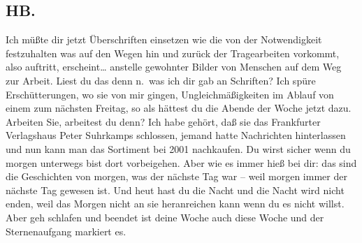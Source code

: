 \documentclass[
]{article}
\author{}
\date{\vspace{-2.5em}}
\begin{document}
\subsection{HB.}\label{hb.}

Ich müßte dir jetzt Überschriften einsetzen wie die von der
Notwendigkeit festzuhalten was auf den Wegen hin und zurück der
Tragearbeiten vorkommt, also auftritt, erscheint\ldots{} anstelle
gewohnter Bilder von Menschen auf dem Weg zur Arbeit. Liest du das denn
n.~was ich dir gab an Schriften? Ich spüre Erschütterungen, wo sie von
mir gingen, Ungleichmäßigkeiten im Ablauf von einem zum nächsten
Freitag, so als hättest du die Abende der Woche jetzt dazu. Arbeiten
Sie, arbeitest du denn? Ich habe gehört, daß sie das Frankfurter
Verlagshaus Peter Suhrkamps schlossen, jemand hatte Nachrichten
hinterlassen und nun kann man das Sortiment bei 2001 nachkaufen. Du
wirst sicher wenn du morgen unterwegs bist dort vorbeigehen. Aber wie es
immer hieß bei dir: das sind die Geschichten von morgen, was der nächste
Tag war -- weil morgen immer der nächste Tag gewesen ist. Und heut hast
du die Nacht und die Nacht wird nicht enden, weil das Morgen nicht an
sie heranreichen kann wenn du es nicht willst. Aber geh schlafen und
beendet ist deine Woche auch diese Woche und der Sternenaufgang markiert
es.
\end{document}
